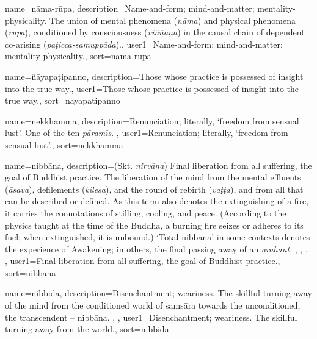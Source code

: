 {
name={n\=ama-r\=upa},
description={Name-and-form; mind-and-matter; mentality-physicality. The union of mental phenomena (\textit{n\=ama}) and physical phenomena (\textit{r\=upa}), conditioned by consciousness (\textit{vi\~n\~n\=a\d{n}a}) in the causal chain of dependent co-arising (\textit{pa\d{t}icca-samupp\=ada}).},
user1={Name-and-form; mind-and-matter; mentality-physicality.},
sort={nama-rupa}
}

{
name=\~n\=ayapa\d{t}ipanno,
description={Those whose practice is possessed of insight into the true way.},
user1={Those whose practice is possessed of insight into the true way.},
sort={nayapatipanno}
}

{
name={nekkhamma},
description={Renunciation; literally, `freedom from sensual lust'. One of the ten \textit{p\=aram\={\i}s}. \protect \seepre %
\protect {}%
\protect \seepost %
},
user1={Renunciation; literally, `freedom from sensual lust'.},
sort={nekkhamma}
}

{
name={nibb\=ana},
description={(Skt. \textit{nirv\=ana}) Final liberation from all suffering, the goal of Buddhist practice. The liberation of the mind from the mental effluents (\textit{\=asava}), defilements (\textit{kilesa}), and the round of rebirth (\textit{va\d{t}\d{t}a}), and from all that can be described or defined. As this term also denotes the extinguishing of a fire, it carries the connotations of stilling, cooling, and peace. (According to the physics taught at the time of the Buddha, a burning fire seizes or adheres to its fuel; when extinguished, it is unbound.) `Total nibb\=ana' in some contexts denotes the experience of Awakening; in others, the final passing away of an \textit{arahant}. \protect \seepre %
\protect {}, \protect {}, \protect {}, \protect {}%
\protect \seepost %
},
user1={Final liberation from all suffering, the goal of Buddhist practice.},
sort={nibbana}
}

{
name={nibbid\=a},
description={Disenchantment; weariness. The skillful turning-away of the mind from the conditioned world of sa\d{m}s\=ara towards the unconditioned, the transcendent -- nibb\=ana. \protect \seepre %
\protect {}, \protect {}%
\protect \seepost %
},
user1={Disenchantment; weariness. The skillful turning-away from the world.},
sort={nibbida}
}

